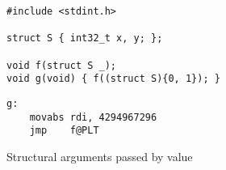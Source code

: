 \begin{figure}[ht]
    \begin{multicols}{2}
        \begin{lstlisting}[style=c]
#include <stdint.h>

struct S { int32_t x, y; };

void f(struct S _);
void g(void) { f((struct S){0, 1}); }
        \end{lstlisting}
        \columnbreak
        \begin{lstlisting}[style=x86]
g:
    movabs rdi, 4294967296
    jmp    f@PLT
        \end{lstlisting}
    \end{multicols}
    \caption{Structural arguments passed by value}
    \label{lst:c++:abi_struct}
\end{figure}
